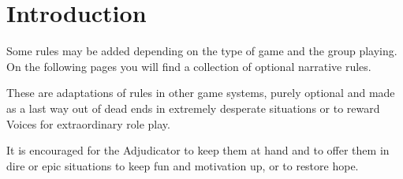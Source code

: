 \documentclass[11pt,a4paper,openany,usenames,dvipsnames]{book}
\begin{document}
	

	\chapter{Introduction}
	Some rules may be added depending on the type of game and the group playing. On the following pages you will find a collection of optional narrative rules.
	\par
	These are adaptations of rules in other game systems,
		purely optional and made as a last way out of dead ends in extremely desperate situations
		or to reward Voices for extraordinary role play.
	\par
	It is encouraged for the Adjudicator to keep them at hand and to offer them in dire or epic situations to keep fun and motivation up, or to restore hope.
\end{document}
